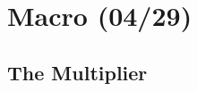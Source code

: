 \documentclass{article}
\begin{document}
\displayoptions

\section{Macro (04/29)}

\subsection{The Multiplier}
\label{sub:the_multiplier}

\end{document}
